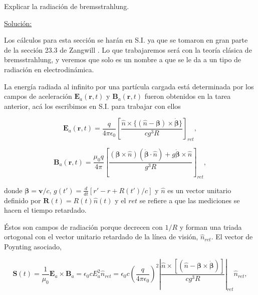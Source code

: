 \documentclass[a4paper,11pt]{article}
\numberwithin{equation}{section}
\begin{document}
Explicar la radiación de bremsstrahlung.

\vspace{.3cm} \underline{Solución:} \vspace{.3cm}

Los cálculos para esta sección se harán en S.I. ya que se tomaron en gran parte
de la sección 23.3 de Zangwill \cite{zangwill}. Lo que trabajaremos será con 
la teoría clásica de bremsstrahlung, y veremos que solo es un nombre a que se 
le da a un tipo de radiación en electrodinámica.

\vspace{.3cm}

La energía radiada al infinito por una partícula cargada está determinada por 
los campos de aceleración $\mathbf{E}_a(\mathbf{r},t)$ y $\mathbf{B}_a(\mathbf{r},t)$ 
fueron obtenidos en la tarea anterior, acá los escribimos en S.I. para trabajar con 
ellos 

\begin{equation}
 \mathbf{E}_a(\mathbf{r},t) = \frac{q}{4\pi\epsilon_0}\left[\frac{\hat{n} 
 \times \{(\hat{n} - \pmb{\beta}) \times \dot{\pmb{\beta}} \}}{cg^3R} \right]_{ret},
\end{equation}

\begin{equation}
 \mathbf{B}_a(\mathbf{r},t) = \frac{\mu_0q}{4\pi}\left[\frac{(\pmb{\beta} \times 
 \hat{n})(\dot{\pmb{\beta}} \cdot \hat{n}) + g\dot{\pmb{\beta}} 
 \times \hat{n}}{g^3R} \right]_{ret},
\end{equation}

donde $\pmb{\beta} = \mathbf{v}/c$, $g(t') = \frac{d}{dt}[r' - r + R(t')/c]$ y 
$\hat{n}$ es un vector unitario definido por $\mathbf{R}(t) = R(t)\hat{n}(t)$ y 
el $ret$ se refiere a que las mediciones se hacen el tiempo retardado. 

\vspace{.3cm}

Éstos son campos de radiación porque decrecen con $1/R$ y forman una triada 
ortogonal con el vector unitario retardado de la línea de visión, $\hat{n}_{ret}$. 
El vector de Poynting asociado, 

\begin{equation}
 \mathbf{S}(t) = \frac{1}{\mu_0}\mathbf{E}_a \times \mathbf{B}_a = 
 \epsilon_0cE_{a}^2 \hat{n}_{ret} = \epsilon_0c\left(\frac{q}{4\pi\epsilon_0}\right)^2 
 \left|\frac{\hat{n} \times [(\hat{n} - 
 \pmb{\beta} \times \dot{\pmb{\beta}})]}{cg^3R}\right|_{ret} \hat{n}_{ret}, 
\end{equation}
\end{document}
